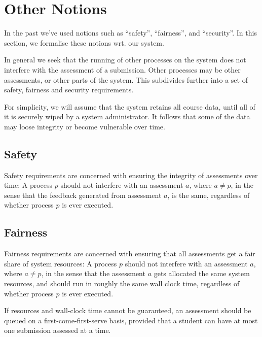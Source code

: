 
\section{Other Notions}

In the past we've used notions such as ``safety'', ``fairness'', and
``security''.  In this section, we formalise these notions wrt. our system.

In general we seek that the running of other processes on the system does not
interfere with the assessment of a submission. Other processes may be other
assessments, or other parts of the system. This subdivides further into a set
of safety, fairness and security requirements.

For simplicity, we will assume that the system retains all course data, until
all of it is securely wiped by a system administrator. It follows that some of
the data may loose integrity or become vulnerable over time.



\subsection{Safety}

Safety requirements are concerned with ensuring the integrity of assessments
over time: A process $p$ should not interfere with an assessment $a$, where
$a\neq p$, in the sense that the feedback generated from assessment $a$, is the
same, regardless of whether process $p$ is ever executed.

\subsection{Fairness}

Fairness requirements are concerned with ensuring that all assessments get a
fair share of system resources: A process $p$ should not interfere with an
assessment $a$, where $a\neq p$, in the sense that the assessment $a$ gets
allocated the same system resources, and should run in roughly the same wall
clock time, regardless of whether process $p$ is ever executed.

If resources and wall-clock time cannot be guaranteed, an assessment should be
queued on a first-come-first-serve basis, provided that a student can have at
most one submission assessed at a time.

